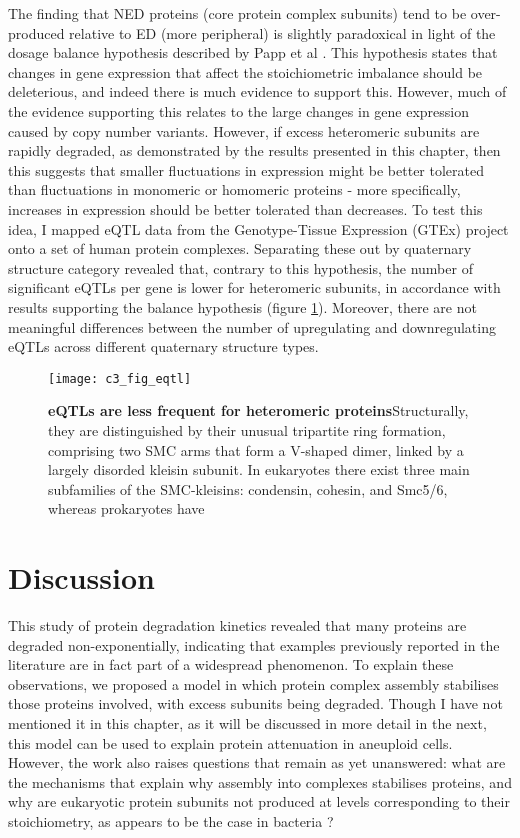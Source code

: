 \documentclass[a4paper,11pt,twoside,openright]{scrbook}
\begin{document}
The finding that NED proteins (core protein complex subunits) tend to be over-produced relative to ED (more peripheral) is slightly paradoxical in light of the dosage balance hypothesis described by Papp et al \cite{Papp2003}. This hypothesis states that changes in gene expression that affect the stoichiometric imbalance should be deleterious, and indeed there is much evidence to support this. However, much of the evidence supporting this relates to the large changes in gene expression caused by copy number variants. However, if excess heteromeric subunits are rapidly degraded, as demonstrated by the results presented in this chapter, then this suggests that smaller fluctuations in expression might be better tolerated than fluctuations in monomeric or homomeric proteins - more specifically, increases in expression should be better tolerated than decreases. To test this idea, I mapped eQTL data from the Genotype-Tissue Expression \cite{Brown2016} (GTEx) project onto a set of human protein complexes. Separating these out by quaternary structure category revealed that, contrary to this hypothesis, the number of significant eQTLs per gene is lower for heteromeric subunits, in accordance with results supporting the balance hypothesis (figure \ref{figure:eqtls}). Moreover, there are not meaningful differences between the number of upregulating and downregulating eQTLs across different quaternary structure types.

\begin{figure}[h]
\fcapsideright
    {\caption[eQTLs are less frequent for heteromeric proteins]{\sffamily\textbf{eQTLs are less frequent for heteromeric proteins}\newline \small Structurally, they are distinguished by their unusual tripartite ring formation, comprising two SMC arms that form a V-shaped dimer, linked by a largely disorded kleisin subunit. In eukaryotes there exist three main subfamilies of the SMC-kleisins: condensin, cohesin, and Smc5/6, whereas prokaryotes have }\label{figure:eqtls}}
    {\texttt{[image: c3\_fig\_eqtl]}}
\end{figure}

\section{Discussion}

This study of protein degradation kinetics revealed that many proteins are degraded non-exponentially, indicating that examples previously reported in the literature are in fact part of a widespread phenomenon. To explain these observations, we proposed a model in which protein complex assembly stabilises those proteins involved, with excess subunits being degraded. Though I have not mentioned it in this chapter, as it will be discussed in more detail in the next, this model can be used to explain protein attenuation in aneuploid cells. However, the work also raises questions that remain as yet unanswered: what are the mechanisms that explain why assembly into complexes stabilises proteins, and why are eukaryotic protein subunits not produced at levels corresponding to their stoichiometry, as appears to be the case in bacteria \cite{Li2014b}?
\end{document}
